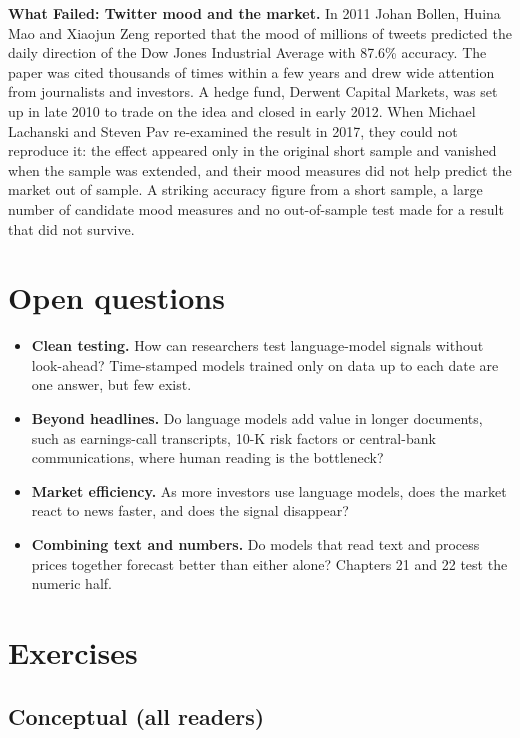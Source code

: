 \begin{callout}
\textbf{What Failed: Twitter mood and the market.} In 2011 Johan Bollen, Huina Mao and Xiaojun Zeng reported that the mood of millions of tweets predicted the daily direction of the Dow Jones Industrial Average with 87.6\% accuracy. The paper was cited thousands of times within a few years and drew wide attention from journalists and investors. A hedge fund, Derwent Capital Markets, was set up in late 2010 to trade on the idea and closed in early 2012. When Michael Lachanski and Steven Pav re-examined the result in 2017, they could not reproduce it: the effect appeared only in the original short sample and vanished when the sample was extended, and their mood measures did not help predict the market out of sample. A striking accuracy figure from a short sample, a large number of candidate mood measures and no out-of-sample test made for a result that did not survive.
\end{callout}

\section{Open questions}
\label{sec:23-open}

\begin{itemize}
  \item \textbf{Clean testing.} How can researchers test language-model signals without look-ahead? Time-stamped models trained only on data up to each date are one answer, but few exist.
  \item \textbf{Beyond headlines.} Do language models add value in longer documents, such as earnings-call transcripts, 10-K risk factors or central-bank communications, where human reading is the bottleneck?
  \item \textbf{Market efficiency.} As more investors use language models, does the market react to news faster, and does the signal disappear?
  \item \textbf{Combining text and numbers.} Do models that read text and process prices together forecast better than either alone? Chapters 21 and 22 test the numeric half.
\end{itemize}

\section*{Exercises}

\subsection*{Conceptual (all readers)}


